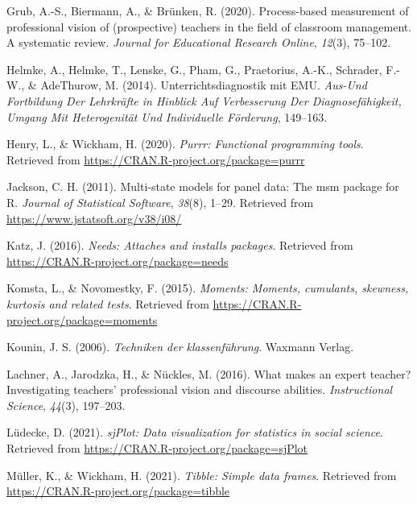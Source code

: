 \documentclass[
  man,floatsintext]{apa6}
\newlength{\cslhangindent}
\newlength{\cslentryspacingunit} %
\newenvironment{CSLReferences}[2] %
 {%
  \setlength{\parindent}{0pt}
  \ifodd #1
  \let\oldpar\par
  \def\par{\hangindent=\cslhangindent\oldpar}
  \fi
  \setlength{\parskip}{#2\cslentryspacingunit}
 }%
 {}
\begin{document}
\begin{CSLReferences}{1}{0}
\leavevmode{}%
Grub, A.-S., Biermann, A., \& Brünken, R. (2020). Process-based measurement of professional vision of (prospective) teachers in the field of classroom management. A systematic review. \emph{Journal for Educational Research Online}, \emph{12}(3), 75--102.

\leavevmode{}%
Helmke, A., Helmke, T., Lenske, G., Pham, G., Praetorius, A.-K., Schrader, F.-W., \& AdeThurow, M. (2014). Unterrichtsdiagnostik mit EMU. \emph{Aus-Und Fortbildung Der Lehrkr{ä}fte in Hinblick Auf Verbesserung Der Diagnosef{ä}higkeit, Umgang Mit Heterogenit{ä}t Und Individuelle F{ö}rderung}, 149--163.

\leavevmode{}%
Henry, L., \& Wickham, H. (2020). \emph{Purrr: Functional programming tools}. Retrieved from \url{https://CRAN.R-project.org/package=purrr}

\leavevmode{}%
Jackson, C. H. (2011). Multi-state models for panel data: The {msm} package for {R}. \emph{Journal of Statistical Software}, \emph{38}(8), 1--29. Retrieved from \url{https://www.jstatsoft.org/v38/i08/}

\leavevmode{}%
Katz, J. (2016). \emph{Needs: Attaches and installs packages}. Retrieved from \url{https://CRAN.R-project.org/package=needs}

\leavevmode{}%
Komsta, L., \& Novomestky, F. (2015). \emph{Moments: Moments, cumulants, skewness, kurtosis and related tests}. Retrieved from \url{https://CRAN.R-project.org/package=moments}

\leavevmode{}%
Kounin, J. S. (2006). \emph{Techniken der klassenf{ü}hrung}. Waxmann Verlag.

\leavevmode{}%
Lachner, A., Jarodzka, H., \& Nückles, M. (2016). What makes an expert teacher? Investigating teachers' professional vision and discourse abilities. \emph{Instructional Science}, \emph{44}(3), 197--203.

\leavevmode{}%
Lüdecke, D. (2021). \emph{sjPlot: Data visualization for statistics in social science}. Retrieved from \url{https://CRAN.R-project.org/package=sjPlot}

\leavevmode{}%
Müller, K., \& Wickham, H. (2021). \emph{Tibble: Simple data frames}. Retrieved from \url{https://CRAN.R-project.org/package=tibble}


\end{CSLReferences}
\end{document}
